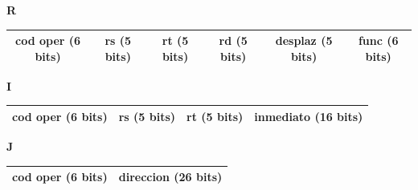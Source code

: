 \documentclass[24pt,letterpaper]{article}
\begin{document}
\vspace{0.2cm}
\noindent \textbf{R} \\
\begin{tabular}{|c|c|c|c|c|c|}
\hline
cod oper (6 bits) & rs (5 bits) & rt (5 bits) & rd (5 bits) & desplaz (5 bits) & func (6 bits) \\ \hline
\end{tabular}

\vspace{0.3cm}
\noindent \textbf{I} \\
\begin{tabular}{|c|c|c|c|}
\hline
cod oper (6 bits) & rs (5 bits) & rt (5 bits) & inmediato (16 bits) \\ \hline
\end{tabular}

\vspace{0.3cm}
\noindent \textbf{J} \\
\begin{tabular}{|c|c|}
\hline
cod oper (6 bits) & direccion (26 bits) \\ \hline
\end{tabular}
\end{document}
